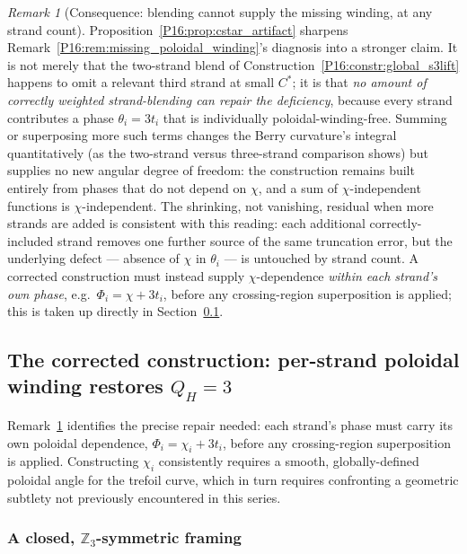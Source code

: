 \documentclass[11pt,a4paper]{article}
\theoremstyle{definition}\newtheorem{definition}[theorem]{Definition}
\theoremstyle{remark}
\newtheorem{remark}[theorem]{Remark}
\theoremstyle{definition}\newtheorem{construction}[theorem]{Construction}
\newcommand{\QH}{Q_H}
\begin{document}
\begin{remark}[Consequence: blending cannot supply the missing
  winding, at any strand count]
\label{P16:rem:blending_insufficient}
Proposition~\ref{P16:prop:cstar_artifact} sharpens
Remark~\ref{P16:rem:missing_poloidal_winding}'s diagnosis into a stronger
claim. It is not merely that the two-strand blend of
Construction~\ref{P16:constr:global_s3lift} happens to omit a relevant
third strand at small $C^*$; it is that \emph{no amount of correctly
weighted strand-blending can repair the deficiency}, because every
strand contributes a phase $\theta_i=3t_i$ that is individually
poloidal-winding-free. Summing or superposing more such terms changes
the Berry curvature's integral quantitatively (as the two-strand
versus three-strand comparison shows) but supplies no new angular
degree of freedom: the construction remains built entirely from phases
that do not depend on $\chi$, and a sum of $\chi$-independent
functions is $\chi$-independent. The shrinking, not vanishing,
residual when more strands are added is consistent with this reading:
each additional correctly-included strand removes one further source
of the same truncation error, but the underlying defect --- absence
of $\chi$ in $\theta_i$ --- is untouched by strand count. A
corrected construction must instead supply $\chi$-dependence
\emph{within each strand's own phase}, e.g.\ $\Phi_i=\chi+3t_i$,
before any crossing-region superposition is applied; this is taken up
directly in Section~\ref{P16:sec:perstrand_winding}.
\end{remark}

\subsection{The corrected construction: per-strand poloidal winding
  restores $\QH=3$}
\label{P16:sec:perstrand_winding}

Remark~\ref{P16:rem:blending_insufficient} identifies the precise repair
needed: each strand's phase must carry its own poloidal dependence,
$\Phi_i=\chi_i+3t_i$, before any crossing-region superposition is
applied. Constructing $\chi_i$ consistently requires a smooth,
globally-defined poloidal angle for the trefoil curve, which in turn
requires confronting a geometric subtlety not previously encountered
in this series.

\subsubsection{A closed, $\mathbb{Z}_3$-symmetric framing}
\end{document}
